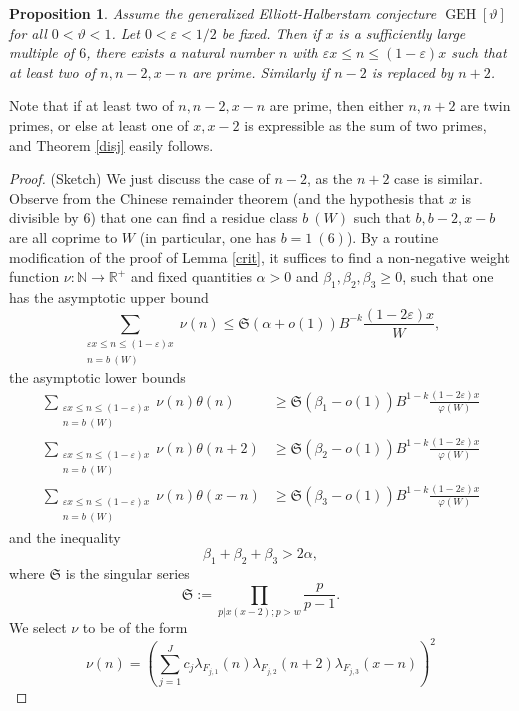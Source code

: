 \documentclass{bmcart}
\DeclareMathOperator*\GEH{GEH}
\theoremstyle{plain}
\newtheorem{proposition}[theorem]{Proposition}
\theoremstyle{definition}
\newcommand\R{\mathbb{R}}
\newcommand\N{\mathbb{N}}
\newcommand\eps{\varepsilon}
\renewcommand{\phi}{\varphi}
\begin{document}
\begin{proposition}  Assume the generalized Elliott-Halberstam conjecture $\GEH[\vartheta]$ for all $0 < \vartheta < 1$.  Let $0 < \eps < 1/2$ be fixed.  Then if $x$ is a sufficiently large multiple of $6$, there exists a natural number $n$ with $\eps x \leq n \leq (1-\eps) x$ such that at least two of $n, n-2, x-n$ are prime.  Similarly if $n-2$ is replaced by $n+2$.
\end{proposition}

Note that if at least two of $n,n-2,x-n$ are prime, then either $n,n+2$ are twin primes, or else at least one of $x,x-2$ is expressible as the sum of two primes, and Theorem \ref{disj} easily follows.

\begin{proof} (Sketch) We just discuss the case of $n-2$, as the $n+2$ case is similar. Observe from the Chinese remainder theorem (and the hypothesis that $x$ is divisible by $6$) that one can find a residue class $b\ (W)$ such that $b, b-2, x-b$ are all coprime to $W$ (in particular, one has $b=1\ (6)$).   By a routine modification of the proof of Lemma \ref{crit}, it suffices to  find a non-negative weight
  function $\nu \colon \N \to \R^+$ and fixed quantities $\alpha > 0$ and $\beta_1,\beta_2,\beta_3 \geq
  0$, such that one has the
  asymptotic upper bound
$$
 \sum_{\substack{\eps x \leq n \leq (1-\eps) x\\ n = b\ (W)}} \nu(n) \leq {\mathfrak S} (\alpha+o(1)) B^{-k} \frac{(1-2\eps) x}{W},
$$
the asymptotic lower bounds
\begin{align*}
  \sum_{\substack{\eps x \leq n \leq (1-\eps) x\\ n = b\ (W)}} \nu(n) \theta(n) &\geq {\mathfrak S} (\beta_1-o(1)) B^{1-k} \frac{(1-2\eps) x}{\phi(W)} \\
  \sum_{\substack{\eps x \leq n \leq (1-\eps) x\\ n = b\ (W)}} \nu(n) \theta(n+2) &\geq {\mathfrak S} (\beta_2-o(1)) B^{1-k} \frac{(1-2\eps) x}{\phi(W)} \\
  \sum_{\substack{\eps x \leq n \leq (1-\eps) x\\ n = b\ (W)}} \nu(n) \theta(x-n) &\geq {\mathfrak S} (\beta_3-o(1)) B^{1-k} \frac{(1-2\eps) x}{\phi(W)} 
\end{align*}
and the inequality
$$ \beta_1+\beta_2+\beta_3 > 2 \alpha,$$
where ${\mathfrak S}$ is the singular series
$$ {\mathfrak S} := \prod_{p|x(x-2); p > w} \frac{p}{p-1}.$$
We select $\nu$ to be of the form
$$ \nu(n) = \left( \sum_{j=1}^J c_j \lambda_{F_{j,1}}(n) \lambda_{F_{j,2}}(n+2) \lambda_{F_{j,3}}(x-n) \right)^2 $$

\end{proof}
\end{document}
